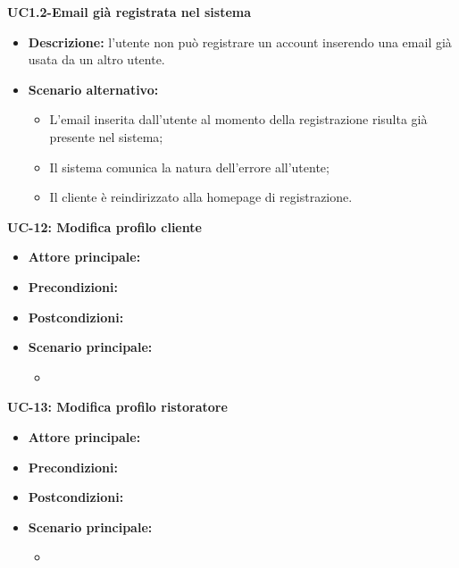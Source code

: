 \textbf{UC1.2-Email già registrata nel sistema}
\begin{itemize}
    \item \textbf{Descrizione: }l'utente non può registrare un account inserendo una email già usata da un altro utente.
    \item \textbf{Scenario alternativo:}
    \begin{itemize}
        \item L'email inserita dall'utente al momento della registrazione risulta già presente nel sistema;
        \item Il sistema comunica la natura dell'errore all'utente;
        \item Il cliente è reindirizzato alla homepage di registrazione.
    \end{itemize}
\end{itemize}
\break

\textbf{UC-12: Modifica profilo cliente}
\begin{itemize}
\item \textbf{Attore principale:} 
\item \textbf{Precondizioni:} 
\item \textbf{Postcondizioni:} 
\item \textbf{Scenario principale:}
\begin{itemize}
    \item 
\end{itemize}
\end{itemize}

\textbf{UC-13: Modifica profilo ristoratore}
\begin{itemize}
\item \textbf{Attore principale:} 
\item \textbf{Precondizioni:} 
\item \textbf{Postcondizioni:} 
\item \textbf{Scenario principale:}
\begin{itemize}
    \item 
\end{itemize}
\end{itemize}

